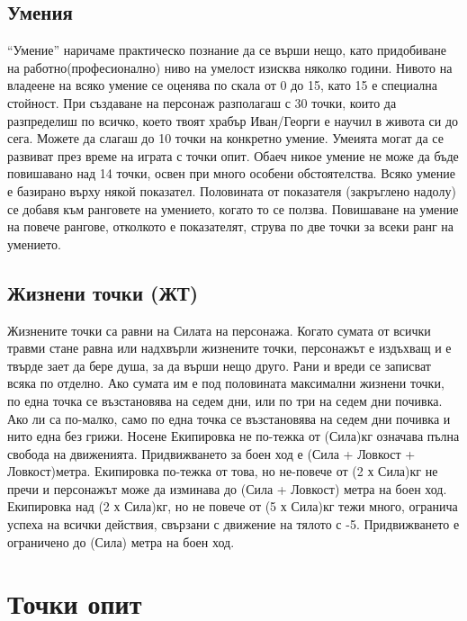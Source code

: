 \subsection{Умения}
“Умение” наричаме практическо познание да се върши нещо, като придобиване на работно(професионално) ниво на умелост изисква няколко години. Нивото на владеене на всяко умение се оценява по скала от 0 до 15, като 15 е специална стойност.
При създаване на персонаж разполагаш с 30 точки, които да разпределиш по всичко, което твоят храбър Иван/Георги е научил в живота си до сега. Можете да слагаш до 10 точки на конкретно умение.
Умеията могат да се развиват през време на играта с точки опит. Обаеч никое умение не може да бъде повишавано над 14 точки, освен при много особени обстоятелства.
Всяко умение е базирано върху някой показател. Половината от показателя (закръглено надолу) се добавя към ранговете на умението, когато то се ползва. Повишаване на умение на повече рангове,  отколкото е показателят, струва по две точки за всеки ранг на умението.

\subsection{Жизнени точки (ЖТ)}
Жизнените точки са равни на Силата на персонажа. Когато сумата от всички травми стане равна или надхвърли жизнените точки, персонажът е издъхващ и е твърде зает да бере душа, за да върши нещо друго. 
Рани и вреди се записват всяка по отделно. Ако сумата им е под половината максимални жизнени точки, по една точка се възстановява на седем дни, или по три на седем дни почивка. Ако ли са по-малко, само по една точка се възстановява на седем дни почивка и нито една без грижи.
Носене
Екипировка не по-тежка от (Сила)кг означава пълна свобода на движенията. Придвижването за боен ход е (Сила + Ловкост + Ловкост)метра.
Екипировка по-тежка от това, но не-повече от (2 х Сила)кг не пречи и персонажът може да изминава до (Сила + Ловкост) метра на боен ход.
Екипировка над (2 х Сила)кг, но не повече от (5 х Сила)кг тежи много, огранича успеха на всички действия, свързани с движение на тялото с -5. Придвижването е ограничено до (Сила) метра на боен ход.

\section{Точки опит}
